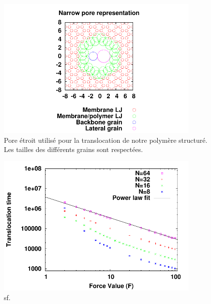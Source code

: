 \documentclass[a4paper,11pt]{article}
\begin{document}
\begin{figure}[H]
\begin{center}
\includegraphics[width=0.9\textwidth]{thinpore.pdf}


\caption{Pore étroit utilisé pour la translocation de notre polymère structuré. Les tailles des différents grains sont respectées. }
\label{porethin}

\end{center}
\end{figure}

\begin{figure}[H]
\begin{center}
\includegraphics[width=0.9\textwidth]{sptransloc.pdf}
\caption{sf.}
\label{sptransloc}
\end{center}
\end{figure}
\end{document}
